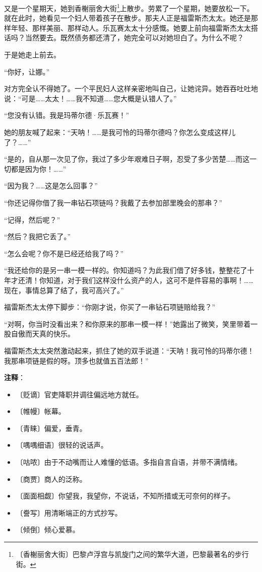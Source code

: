 \documentclass[12pt,UTF-8,openany]{ctexbook}
\begin{document}
\begin{normalsize}
    又是一个星期天，她到香榭丽舍大街\footnote{〔香榭丽舍大街〕巴黎卢浮宫与凯旋门之间的繁华大道，巴黎最著名的步行街。}上散步。劳累了一个星期，她要放松一下。就在此时，她看见一个妇人带着孩子在散步。那夫人正是福雷斯杰太太。她还是那样年轻、那样美丽、那样动人。乐瓦赛太太十分感慨。她要上前向福雷斯杰太太搭话吗？当然要去。既然债务都还清了，她完全可以对她坦白了。为什么不呢？
    
    于是她走上前去。
    
    “你好，让娜。”
    
    对方完全认不得她了。一个平民妇人这样亲密地叫自己，让她诧异。她吞吞吐吐地说：“可是……太太！……我不知道……您大概是认错人了。”
    
    “您没有认错。我是玛蒂尔德·乐瓦赛！”
    
    她的朋友喊了起来：“天呐！……是我可怜的玛蒂尔德吗？你怎么变成这样儿了？……”
    
    “是的，自从那一次见了你，我过了多少年艰难日子啊，忍受了多少苦楚……而这一切都是因为你！……”
    
    “因为我？……这是怎么回事？”
    
    “你还记得你借了我一串钻石项链吗？我戴了去参加部里晚会的那串？”
    
    “记得，然后呢？”
    
    “然后？我把它丢了。”
    
    “怎么会呢？你不是已经还给我了吗？”
    
    “我还给你的是另一串一模一样的。你知道吗？为此我们借了好多钱，整整花了十年才还清！你知道，对于我们这样没什么资产的人，这可不是件容易的事啊！……现在，事情总算了结了，我可高兴了。”
    
    福雷斯杰太太停下脚步：“你刚才说，你买了一串钻石项链赔给我？”
    
    “对啊，你当时没看出来？和你原来的那串一模一样！”她露出了微笑，笑里带着一股自傲而天真的快乐。
    
    福雷斯杰太太突然激动起来，抓住了她的双手说道：“天呐！我可怜的玛蒂尔德！我那串项链是假的呀。顶多也就值五百法郎！”
    
\end{normalsize}


\newpage

\textbf{注释}：

\vspace{-1em}

\begin{itemize}
    \setlength\itemsep{-0.2em}
    \item 〔贬谪〕官吏降职并调往偏远地方就任。
    \item 〔帷幔〕帐幕。
    \item 〔青睐〕偏爱，垂青。
    \item 〔喁喁细语〕很轻的说话声。
    \item 〔咕哝〕由于不动嘴而让人难懂的低语。多指自言自语，并带不满情绪。
    \item 〔商贾〕商人的泛称。
    \item 〔面面相觑〕你望我，我望你，不说话，不知所措或无可奈何的样子。
    \item 〔誊写〕用清晰端正的方式抄写。
    \item 〔倾倒〕倾心爱慕。
\end{itemize}
\end{document}
